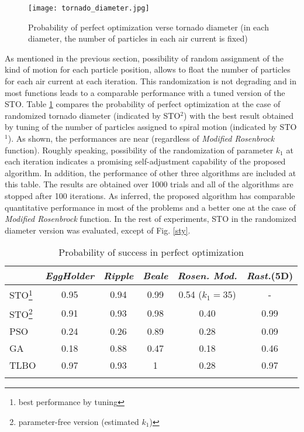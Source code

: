 \documentclass[conference]{IEEEtran}
\begin{document}
\begin{figure}[h]
 \centering
  \texttt{[image: tornado\_diameter.jpg]}
  \caption{Probability of perfect optimization verse tornado diameter (in each diameter, the number of particles in each air current is fixed)}
  \label{prob}
\end{figure}

As mentioned in the previous section, possibility of random assignment of the kind of motion for each particle position, allows to float the number of particles for each air current at each iteration. This randomization is not degrading and in most functions leads to a comparable performance with a tuned version of the STO. Table \ref{tab} compares the probability of perfect optimization at the case of randomized tornado diameter (indicated by STO$^2$) with the best result obtained by tuning of the number of particles assigned to spiral motion (indicated by STO$^1$). As shown, the performances are near (regardless of \emph{Modified Rosenbrock} function). Roughly speaking, possibility of the randomization of parameter $k_1$ at each iteration indicates a promising self-adjustment capability of the proposed algorithm. In addition, the performance of other three algorithms are included at this table. The results are obtained over 1000 trials and all of the algorithms are stopped after 100 iterations. As inferred, the proposed algorithm has comparable quantitative performance in most of the problems and a better one at the case of \emph{Modified Rosenbrock} function. In the rest of experiments, STO in the randomized diameter version was evaluated, except of Fig. \ref{sty}.

\begin{table}[h!]
 \caption{Probability of success in perfect optimization}
\begin{center}
  \begin{tabular}{l c c c c c}
   
    & \emph{EggHolder} & \emph{Ripple}& \emph{Beale} & \emph{Rosen. Mod.} & \emph{Rast.}(5D) \\
  \hline
  STO\footnote{best performance by tuning}& 0.95 & 0.94 & 0.99& 0.54 ($k_1=35$) & -\\
  STO\footnote{parameter-free version (estimated $k_1$)}& 0.91 & 0.93& 0.98 & 0.40& 0.99 \\
  PSO & 0.24 & 0.26& 0.89 & 0.28& 0.09 \\
  GA & 0.18 & 0.88& 0.47 & 0.18 & 0.46 \\
  TLBO & 0.97 & 0.93& 1 & 0.28& 0.97\\
  \label{tab}

\end{tabular}
\end{center}
\end{table}
\end{document}
